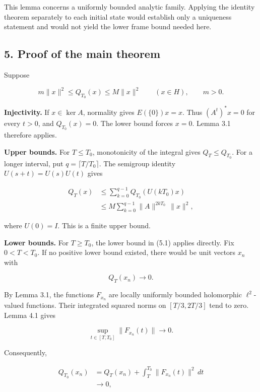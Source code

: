 \documentclass[
  11pt,
]{article}
\begin{document}
This lemma concerns a uniformly bounded analytic family. Applying the
identity theorem separately to each initial state would establish only a
uniqueness statement and would not yield the lower frame bound needed
here.

\subsection{5. Proof of the main
theorem}\label{proof-of-the-main-theorem}

Suppose

\[
m\|x\|^2\leq Q_{T_0}(x)\leq M\|x\|^2
\qquad(x\in H),\qquad m>0.                      \tag{5.1}
\]

\textbf{Injectivity.} If \(x\in\ker A\), normality gives
\(E(\{0\})x=x\). Thus \((A^t)^*x=0\) for every \(t>0\), and
\(Q_{T_0}(x)=0\). The lower bound forces \(x=0\). Lemma 3.1 therefore
applies.

\textbf{Upper bounds.} For \(T\leq T_0\), monotonicity of the integral
gives \(Q_T\leq Q_{T_0}\). For a longer interval, put
\(q=\lceil T/T_0\rceil\). The semigroup identity \(U(s+t)=U(s)U(t)\)
gives

\[
\begin{aligned}
Q_T(x)
&\leq\sum_{k=0}^{q-1}Q_{T_0}(U(kT_0)x)\\
&\leq M\sum_{k=0}^{q-1}\|A\|^{2kT_0}\,\|x\|^2,
\end{aligned}                                   \tag{5.2}
\]

where \(U(0)=I\). This is a finite upper bound.

\textbf{Lower bounds.} For \(T\geq T_0\), the lower bound in (5.1)
applies directly. Fix \(0<T<T_0\). If no positive lower bound existed,
there would be unit vectors \(x_n\) with

\[
Q_T(x_n)\longrightarrow0.                       \tag{5.3}
\]

By Lemma 3.1, the functions \(F_{x_n}\) are locally uniformly bounded
holomorphic \(\ell^2\)-valued functions. Their integrated squared norms
on \([T/3,2T/3]\) tend to zero. Lemma 4.1 gives

\[
\sup_{t\in[T,T_0]}\|F_{x_n}(t)\|\longrightarrow0.
\]

Consequently,

\[
\begin{aligned}
Q_{T_0}(x_n)
&=Q_T(x_n)+\int_T^{T_0}\|F_{x_n}(t)\|^2\,dt\\
&\longrightarrow0,
\end{aligned}
\]
\end{document}
